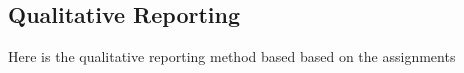\subsection{Qualitative Reporting}

Here is the qualitative reporting method based based on the assignments
